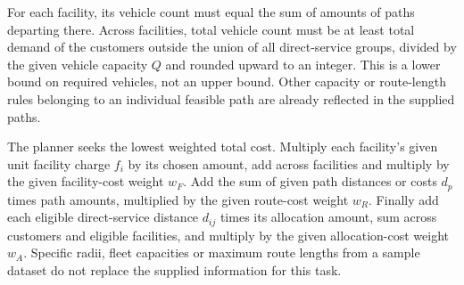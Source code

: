 \documentclass[10pt]{article}
\begin{document}
For each facility, its vehicle count must equal the sum of amounts of paths departing there. Across facilities, total vehicle count must be at least total demand of the customers outside the union of all direct-service groups, divided by the given vehicle capacity $Q$ and rounded upward to an integer. This is a lower bound on required vehicles, not an upper bound. Other capacity or route-length rules belonging to an individual feasible path are already reflected in the supplied paths.

The planner seeks the lowest weighted total cost. Multiply each facility's given unit facility charge $f_i$ by its chosen amount, add across facilities and multiply by the given facility-cost weight $w_F$. Add the sum of given path distances or costs $d_p$ times path amounts, multiplied by the given route-cost weight $w_R$. Finally add each eligible direct-service distance $d_{ij}$ times its allocation amount, sum across customers and eligible facilities, and multiply by the given allocation-cost weight $w_A$. Specific radii, fleet capacities or maximum route lengths from a sample dataset do not replace the supplied information for this task.
\end{document}
